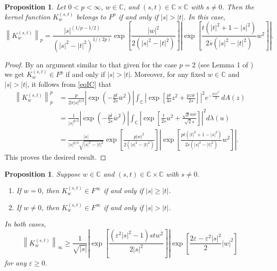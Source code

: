 \documentclass[reqno]{amsart}
\newtheorem{proposition}[theorem]{Proposition}
\newcommand{\C}{{\mathbb C}}
\newcommand{\inc}{\int_{\C}}
\begin{document}
\begin{proposition}\label{propKp}
Let $0<p<\infty$, $w\in\C$, and $(s, t)\in\C\times\C$ with $s\neq0$. Then
the kernel function $K_w^{(s,t)}$ belongs to $F^p$ if and only if $|s|>|t|$.
In this case,
$$\left\|K^{(s,t)}_w\right\|_{p}=\frac{|s|^{(1/p-1/2)}}
{(|s|^2-|t|^2)^{1/(2p)}}\exp\left[\frac{|{w}|^2}{2(|s|^2-|t|^2)}\right]
\left|\exp\left[\frac{t(|t|^2+1-|s|^2)}{2\overline{s}(|s|^2-|t|^2)}{w^2}
\right]\right|.$$
\end{proposition}

\begin{proof}
By an argument similar to that given for the case $p =2$ (see Lemma 1 of
\cite{DZ3}) we get $K_w^{(s,t)}\in F^p$ if and only if $|s|>|t|$. Moreover,
for any fixed $w\in\C$ and $|s|>|t|$, it follows from \eqref{eqIC} that
\begin{align*}
\left\|K^{(s,t)}_w\right\|_p^p&=\frac{p}{2\pi{|s|}^{p/2}}\left|\exp
\left(-\frac{p\overline{t}}{2s}\overline{w}^2\right)\right|
\inc\left|\exp\left[\frac{pt}{4s}z^2+\frac{p z\overline{w}}{2s}
\right]\right|^2e^{-\frac{p|z|^2}{2}}\,dA(z)\\[8pt]
&=\frac{1}{{|s|}^{p/2}}\left|\exp\left(-\frac{p\overline{t}}{2s}
\overline{w}^2\right)\right|\inc\left|\exp\left[\frac{{t}}{2s}{u}^2+
\frac{\sqrt{p}u\overline{w}}{\sqrt{2}s}\right]\right|^2d\lambda(u)\\[8pt]
&=\frac{|s|}{{|s|}^{p/2}\sqrt{|s|^2-|t|^2}}\exp\left[\frac{p|{w}|^2}
{2(|s|^2-|t|^2)}\right]\left|\exp\left[\frac{pt(|t|^2+1-|s|^2)}
{2\overline{s}(|s|^2-|t|^2)}{w^2}\right]\right|.
\end{align*}
This proves the desired result.
\end{proof}

\begin{proposition}\label{propKinfty}
Suppose $w\in\C$ and $(s, t)\in\C\times\C$ with $s\neq0$.
\begin{enumerate}
\item[(a)] If $w=0$, then $K_w^{(s,t)}\in F^\infty$ if and only if $|s|\geq|t|$.
\item[(b)] If $w\neq0$, then $K_w^{(s,t)}\in F^\infty$ if and only if $|s|>|t|$.
\end{enumerate}
In both cases,
$$\left\|K^{(s,t)}_w\right\|_\infty\geq\frac{1}{\sqrt{|s|}}
\left|\exp \left[\frac{(\varepsilon^2|s|^2-1)stw^2}{2|s|^2}\right]\right|
\exp\left[\frac{2\varepsilon-\varepsilon^2|s|^2}{2}|w|^2\right]$$
for any $\varepsilon\geq0$.
\end{proposition}
\end{document}
